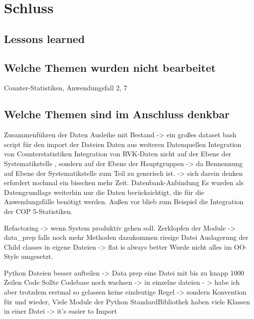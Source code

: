 
\chapter{Schluss}
\label{chap:six}
\section{Lessons learned}
\section{Welche Themen wurden nicht bearbeitet}
Counter-Statistiken, Anwendungsfall 2, 7

\section{Welche Themen sind im Anschluss denkbar}
Zusammenführen der Daten Ausleihe mit Bestand -> ein großes dataset
bash script für den import der Dateien
Daten aus weiteren Datenquellen
Integration von Counterstatistiken
Integration von RVK-Daten nicht auf der Ebene der Systematikstelle , sondern auf der Ebene
der Hauptgruppen -> da Bennennung auf Ebene der Systematikstelle zum Teil zu generisch ist. 
-> sich darein denken erfordert nochmal ein bisschen mehr Zeit.
Datenbank-Anbindung
Es wurden als Datengrundlage weiterhin nur die Daten berücksichtigt, 
    die für die Anwendungsfälle benötigt werden. Außen vor blieb zum Beispiel die Integration der \acrshort{COP 5}-Statistiken.

Refactoring -> wenn System produktiv gehen soll.
Zerklopfen der Module -> data\_prep falls noch mehr Methoden dazukommen  riesige Datei Auslagerung der Child classes in eigene Dateien
-> flat is always better
Wurde nicht alles im OO-Style umgesetzt.

Python Dateien besser aufteilen -> Data prep eine Datei mit bis zu knapp 1000 Zeilen Code
    Sollte Codebase noch wachsen -> in einzelne dateien - > habe ich aber trotzdem erstmal so gelassen
    keine eindeutige Regel -> sondern Konvention für und wieder, Viele Module der Python StandardBibliothek
    haben viele Klassen in einer Datei -> it's easier to Import